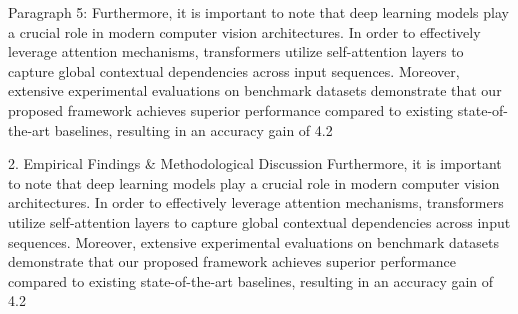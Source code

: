 Paragraph 5: Furthermore, it is important to note that deep learning models play a crucial role in modern computer vision architectures. In order to effectively leverage attention mechanisms, transformers utilize self-attention layers to capture global contextual dependencies across input sequences. Moreover, extensive experimental evaluations on benchmark datasets demonstrate that our proposed framework achieves superior performance compared to existing state-of-the-art baselines, resulting in an accuracy gain of 4.2%


2. Empirical Findings & Methodological Discussion
Furthermore, it is important to note that deep learning models play a crucial role in modern computer vision architectures. In order to effectively leverage attention mechanisms, transformers utilize self-attention layers to capture global contextual dependencies across input sequences. Moreover, extensive experimental evaluations on benchmark datasets demonstrate that our proposed framework achieves superior performance compared to existing state-of-the-art baselines, resulting in an accuracy gain of 4.2%